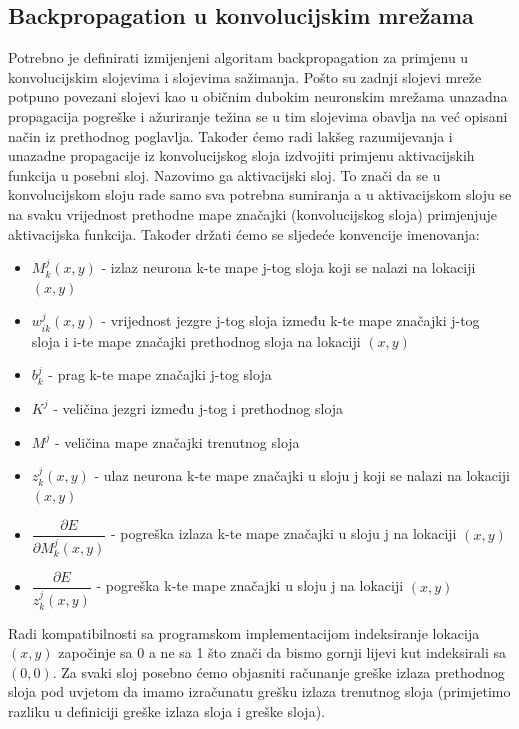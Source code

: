 \documentclass[times, utf8, zavrsni, numeric]{fer}
\begin{document}
\subsection{Backpropagation u konvolucijskim mrežama}
Potrebno je definirati izmijenjeni algoritam backpropagation za primjenu u konvolucijskim slojevima i slojevima sažimanja. Pošto su zadnji slojevi mreže potpuno povezani slojevi kao u običnim dubokim neuronskim mrežama unazadna propagacija pogreške i ažuriranje težina se u tim slojevima obavlja na već opisani način iz prethodnog poglavlja. Također ćemo radi lakšeg razumijevanja i unazadne propagacije iz konvolucijskog sloja izdvojiti primjenu aktivacijskih funkcija u posebni sloj. Nazovimo ga aktivacijski sloj. To znači da se u konvolucijskom sloju rade samo sva potrebna sumiranja a u aktivacijskom sloju se na svaku vrijednost prethodne mape značajki (konvolucijskog sloja) primjenjuje aktivacijska funkcija. Također držati ćemo se sljedeće konvencije imenovanja:
\begin{itemize}
  \item $M_k^j (x, y)$ - izlaz neurona k-te mape j-tog sloja koji se nalazi na lokaciji $(x, y)$
  \item $w^j_{ik} (x, y)$ - vrijednost jezgre j-tog sloja između k-te mape značajki j-tog sloja i i-te mape značajki prethodnog sloja na lokaciji $(x, y)$
  \item $b^j_k$ - prag k-te mape značajki j-tog sloja
  \item $K^j$ - veličina jezgri između j-tog i prethodnog sloja
  \item $M^j$ - veličina mape značajki trenutnog sloja
  \item $z^j_k (x, y)$ - ulaz neurona k-te mape značajki u sloju j koji se nalazi na lokaciji $(x, y)$
  \item $\dfrac{\partial E}{\partial M^j_k (x, y)}$ - pogreška izlaza k-te mape značajki u sloju j na lokaciji $(x, y)$
  \item $\dfrac{\partial E}{z^j_k (x, y)}$ - pogreška k-te mape značajki u sloju j na lokaciji $(x, y)$
\end{itemize}

Radi kompatibilnosti sa programskom implementacijom indeksiranje lokacija $(x, y)$ započinje sa 0 a ne sa 1 što znači da bismo gornji lijevi kut indeksirali sa $(0, 0)$.
Za svaki sloj posebno ćemo objasniti računanje greške izlaza prethodnog sloja pod uvjetom da imamo izračunatu grešku izlaza trenutnog sloja (primjetimo razliku u definiciji greške izlaza sloja i greške sloja).
\end{document}
